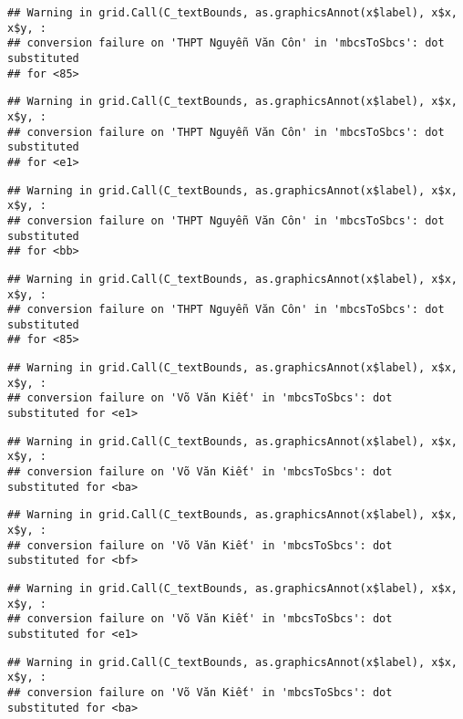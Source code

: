 \documentclass[
]{article}
\begin{document}
\begin{verbatim}
## Warning in grid.Call(C_textBounds, as.graphicsAnnot(x$label), x$x, x$y, :
## conversion failure on 'THPT Nguyễn Văn Côn' in 'mbcsToSbcs': dot substituted
## for <85>
\end{verbatim}

\begin{verbatim}
## Warning in grid.Call(C_textBounds, as.graphicsAnnot(x$label), x$x, x$y, :
## conversion failure on 'THPT Nguyễn Văn Côn' in 'mbcsToSbcs': dot substituted
## for <e1>
\end{verbatim}

\begin{verbatim}
## Warning in grid.Call(C_textBounds, as.graphicsAnnot(x$label), x$x, x$y, :
## conversion failure on 'THPT Nguyễn Văn Côn' in 'mbcsToSbcs': dot substituted
## for <bb>
\end{verbatim}

\begin{verbatim}
## Warning in grid.Call(C_textBounds, as.graphicsAnnot(x$label), x$x, x$y, :
## conversion failure on 'THPT Nguyễn Văn Côn' in 'mbcsToSbcs': dot substituted
## for <85>
\end{verbatim}

\begin{verbatim}
## Warning in grid.Call(C_textBounds, as.graphicsAnnot(x$label), x$x, x$y, :
## conversion failure on 'Võ Văn Kiết' in 'mbcsToSbcs': dot substituted for <e1>
\end{verbatim}

\begin{verbatim}
## Warning in grid.Call(C_textBounds, as.graphicsAnnot(x$label), x$x, x$y, :
## conversion failure on 'Võ Văn Kiết' in 'mbcsToSbcs': dot substituted for <ba>
\end{verbatim}

\begin{verbatim}
## Warning in grid.Call(C_textBounds, as.graphicsAnnot(x$label), x$x, x$y, :
## conversion failure on 'Võ Văn Kiết' in 'mbcsToSbcs': dot substituted for <bf>
\end{verbatim}

\begin{verbatim}
## Warning in grid.Call(C_textBounds, as.graphicsAnnot(x$label), x$x, x$y, :
## conversion failure on 'Võ Văn Kiết' in 'mbcsToSbcs': dot substituted for <e1>
\end{verbatim}

\begin{verbatim}
## Warning in grid.Call(C_textBounds, as.graphicsAnnot(x$label), x$x, x$y, :
## conversion failure on 'Võ Văn Kiết' in 'mbcsToSbcs': dot substituted for <ba>
\end{verbatim}
\end{document}
